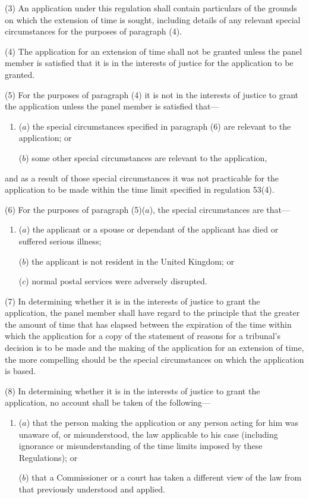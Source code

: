 \documentclass[12pt,a4paper]{article}
\begin{document}
(3) An application under this regulation shall contain particulars of the grounds on which the extension of time is sought, including details of any relevant special circumstances for the purposes of paragraph (4).

(4) The application for an extension of time shall not be granted unless the panel member is satisfied that it is in the interests of justice for the application to be granted.

(5) For the purposes of paragraph (4) it is not in the interests of justice to grant the application unless the panel member is satisfied that—
\begin{enumerate}\item[]
($a$) the special circumstances specified in paragraph (6) are relevant to the application; or

($b$) some other special circumstances are relevant to the application,
\end{enumerate}
and as a result of those special circumstances it was not practicable for the application to be made within the time limit specified in regulation 53(4).

(6) For the purposes of paragraph (5)($a$), the special circumstances are that—
\begin{enumerate}\item[]
($a$) the applicant or a spouse or dependant of the applicant has died or suffered serious illness;

($b$) the applicant is not resident in the United Kingdom; or

($c$) normal postal services were adversely disrupted.
\end{enumerate}

(7) In determining whether it is in the interests of justice to grant the application, the panel member shall have regard to the principle that the greater the amount of time that has elapsed between the expiration of the time within which the application for a copy of the statement of reasons for a tribunal’s decision is to be made and the making of the application for an extension of time, the more compelling should be the special circumstances on which the application is based.

(8) In determining whether it is in the interests of justice to grant the application, no account shall be taken of the following—
\begin{enumerate}\item[]
($a$) that the person making the application or any person acting for him was unaware of, or misunderstood, the law applicable to his case (including ignorance or misunderstanding of the time limits imposed by these Regulations); or

($b$) that a Commissioner or a court has taken a different view of the law from that previously understood and applied.
\end{enumerate}
\end{document}
